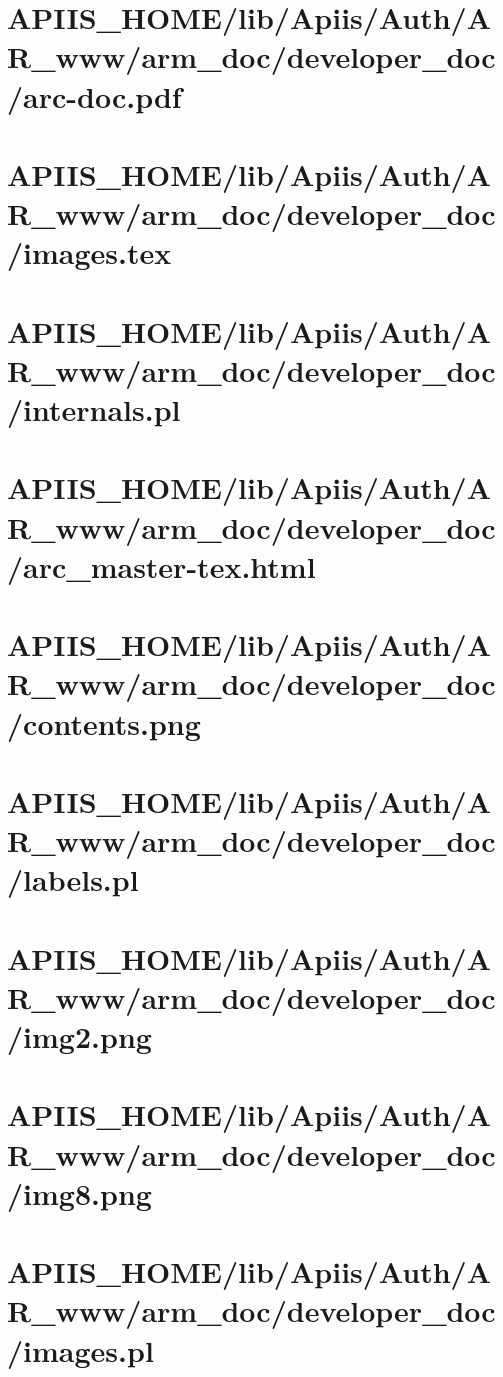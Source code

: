 \section{APIIS\_HOME/lib/Apiis/Auth/AR_www/arm_doc/developer_doc/arc-doc.pdf} 
\section{APIIS\_HOME/lib/Apiis/Auth/AR_www/arm_doc/developer_doc/images.tex} 
\section{APIIS\_HOME/lib/Apiis/Auth/AR_www/arm_doc/developer_doc/internals.pl} 
\section{APIIS\_HOME/lib/Apiis/Auth/AR_www/arm_doc/developer_doc/arc\_master-tex.html} 
\section{APIIS\_HOME/lib/Apiis/Auth/AR_www/arm_doc/developer_doc/contents.png} 
\section{APIIS\_HOME/lib/Apiis/Auth/AR_www/arm_doc/developer_doc/labels.pl} 
\section{APIIS\_HOME/lib/Apiis/Auth/AR_www/arm_doc/developer_doc/img2.png} 
\section{APIIS\_HOME/lib/Apiis/Auth/AR_www/arm_doc/developer_doc/img8.png} 
\section{APIIS\_HOME/lib/Apiis/Auth/AR_www/arm_doc/developer_doc/images.pl} 
